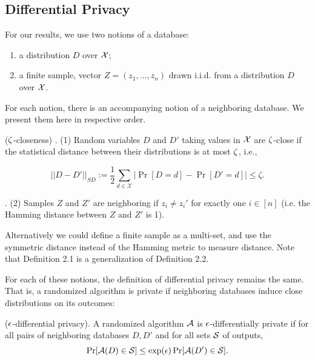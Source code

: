 

\subsection{Differential Privacy}

For our results, we use two notions of a database:

\begin{enumerate}
	\item a distribution $D$ over $\X$;
	\item a finite sample, vector $Z = (z_1, ..., z_n)$ drawn i.i.d. from a distribution $D$ over $\X$.
\end{enumerate}
For each notion, there is an accompanying notion of a neighboring
database. We present them here in respective order.

\begin{defn}
  ($\zt$-closeness) \cite{2dplimits}. (1) Random variables $D$ and $D'$ taking values in
  $\X$ are $\zt$-close if the statistical distance between their
  distributions is at most $\zt$, i.e.,

	$$ ||D-D'||_{\textit{SD}} :=\frac{1}{2}\sum_{d\in \mathcal{X}}
  |\Pr[D=d] - \Pr[D'=d]| \leq \zeta.$$
\end{defn}

\begin{defn} \cite{Kasiviswanathan:2011:WLP:2078965.2078976}.
  (2) Samples $Z$ and $Z'$ are neighboring if $z_i \neq z_i'$ for
  exactly one $i \in [n]$ (i.e. the Hamming distance between $Z$ and
  $Z'$ is 1).
\end{defn}
Alternatively we could define a finite sample as a multi-set, and use
the symmetric distance instead of the Hamming metric to measure
distance. Note that Definition 2.1 is a generalization of Definition
2.2.

For each of these notions, the definition of differential privacy
remains the same. That is, a randomized algorithm is private if
neighboring databases induce close distributions on its outcomes:

\begin{defn}
  ($\eps$-differential privacy). \cite{dpbook} A randomized algorithm
    $\A$ is $\eps$-differentially private if for all pairs of
    neighboring databases $D,D'$ and for all sets $\S$ of outputs,
    $$\Pr[\A(D)\in \S] \leq \exp(\eps)\Pr[\A(D')\in \S].$$
\end{defn}

